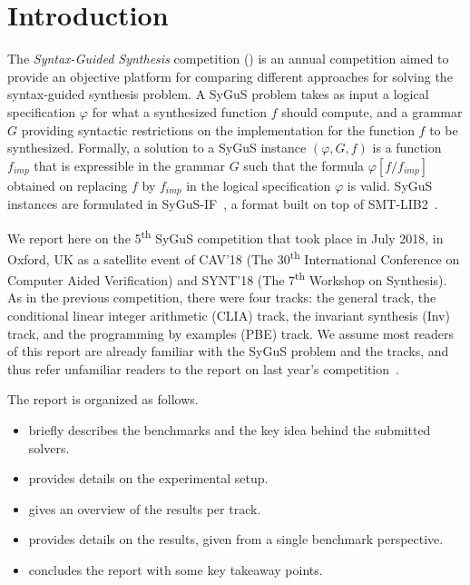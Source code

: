 \section{Introduction}
\label{sec:intro}

The \emph{Syntax-Guided Synthesis} competition (\comp) is an annual competition aimed to provide
an objective platform for comparing different approaches for solving the syntax-guided synthesis problem.
A SyGuS problem takes as input a logical specification $\varphi$ for what a synthesized function $f$ should compute,
and a grammar $G$ providing syntactic restrictions on the implementation for the function $f$ to be synthesized.
Formally, a solution to a SyGuS instance $(\varphi,G,f)$ is a function $f_{imp}$ that is expressible in the grammar $G$
such that the formula $\varphi[f/f_{imp}]$ obtained on replacing $f$ by $f_{imp}$ in the logical specification $\varphi$ is valid.
SyGuS instances are formulated in SyGuS-IF~\cite{RaghothamanU14}, a format built on top of SMT-LIB2~\cite{smtlib}.

We report here on the 5\textsuperscript{th} SyGuS competition that took place in July 2018,
in Oxford, UK as a satellite event of CAV'18 (The 30\textsuperscript{th} International Conference on Computer Aided Verification)
and SYNT'18 (The 7\textsuperscript{th} Workshop on Synthesis).
As in the previous competition, there were four tracks:
the general track, the conditional linear integer arithmetic (CLIA) track, the invariant synthesis (Inv) track,
and the programming by examples (PBE) track.
We assume most readers of this report are already familiar with the SyGuS problem and the \comp{} tracks,
and thus refer unfamiliar readers to the report on last year's competition~\cite{SyGuSComp17}.

The report is organized as follows.
\begin{itemize}[topsep=0.25em]
    \item {} briefly describes the benchmarks and the key idea behind the submitted solvers.
    \item {} provides details on the experimental setup.
    \item {} gives an overview of the results per track.
    \item {} provides details on the results, given from a single benchmark perspective.
    \item {} concludes the report with some key takeaway points.
\end{itemize}
 